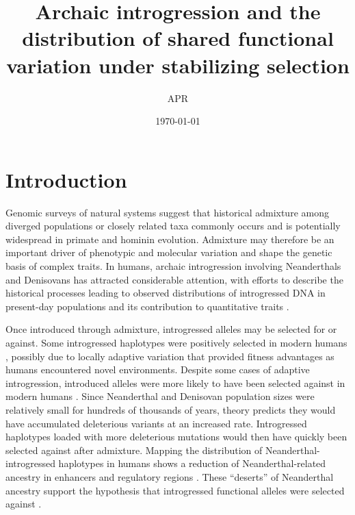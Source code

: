 \documentclass{article}
\title{Archaic introgression and the distribution
of shared functional variation under stabilizing selection}
\author{APR}
\date{\today}
\begin{document}
\maketitle    


\begin{abstract}
    
\end{abstract}

\onehalfspacing

\section*{Introduction}

Genomic surveys of natural systems suggest that historical admixture among
diverged populations or closely related taxa commonly occurs
\citep{brandvain2014speciation,skoglund2015ancient,suvorov2022widespread} and
is potentially widespread in primate
\citep{tung2017contribution,sorensen2023genome} and hominin
\citep{wolf2018outstanding,peter2020100} evolution. Admixture may therefore be
an important driver of phenotypic and molecular variation and shape the genetic
basis of complex traits. In humans, archaic introgression involving
Neanderthals and Denisovans has attracted considerable attention, with efforts
to describe the historical processes leading to observed distributions of
introgressed DNA in present-day populations
\citep{prufer2014complete,villanea2019multiple,chen2020identifying} and its
contribution to quantitative traits
\citep{sankararaman2016combined,wei2023lingering}.

Once introduced through admixture, introgressed alleles may be selected for or
against. Some introgressed haplotypes were positively selected in modern humans
\citep{huerta2014altitude,racimo2017signatures,enard2018evidence,gower2021detecting},
possibly due to locally adaptive variation that provided fitness advantages as
humans encountered novel environments. Despite some cases of adaptive
introgression, introduced alleles were more likely to have been selected
against in modern humans \citep{harris2016genetic,juric2016strength}. Since
Neanderthal and Denisovan population sizes were relatively small for hundreds
of thousands of years, theory predicts they would have accumulated deleterious
variants at an increased rate. Introgressed haplotypes loaded with more
deleterious mutations would then have quickly been selected against after
admixture. Mapping the distribution of Neanderthal-introgressed haplotypes in
humans shows a reduction of Neanderthal-related ancestry in enhancers and
regulatory regions
\citep{petr2019limits,telis2020selection,yermakovich2023long}. These
``deserts'' of Neanderthal ancestry support the hypothesis that introgressed
functional alleles were selected against
\citep{sankararaman2014genomic,sankararaman2016combined}.
\end{document}
